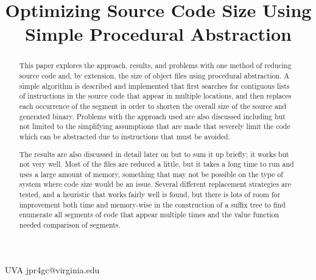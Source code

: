 \documentclass[9pt,nocopyrightspace]{sigplanconf}
\begin{document}
\setlength{\pdfpageheight}{\paperheight}
\setlength{\pdfpagewidth}{\paperwidth}






\title{Optimizing Source Code Size Using Simple Procedural Abstraction}
\subtitle{}

           {UVA}
           {jpr4gc@virginia.edu}

\maketitle

\begin{abstract}
This paper explores the approach, results, and problems with one method of reducing source code and, by extension, the size of object files using procedural abstraction.
A simple algorithm is described and implemented that first searches for contiguous lists of instructions in the source code that appear in multiple locations, and then replaces each occurrence of the segment in order to shorten the overall size of the source and generated binary.
Problems with the approach used are also discussed including but not limited to the simplifying assumptions that are made that severely limit the code which can be abstracted due to instructions that must be avoided.

The results are also discussed in detail later on but to sum it up briefly; it works but not very well.
Most of the files are reduced a little, but it takes a long time to run and uses a large amount of memory, something that may not be possible on the type of system where code size would be an issue.
Several different replacement strategies are tested, and a heuristic that works fairly well is found, but there is lots of room for improvement both time and memory-wise in the construction of a suffix tree to find enumerate all segments of code that appear multiple times and the value function needed comparison of segments.

\end{abstract}
\end{document}
